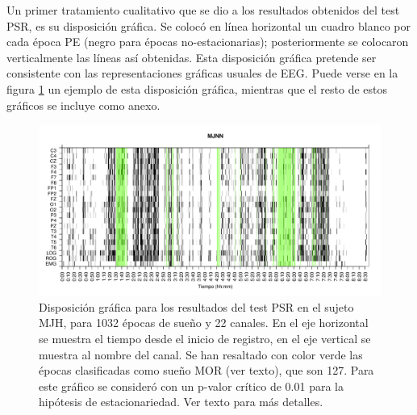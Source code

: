 %

Un primer tratamiento cualitativo que se dio a los resultados obtenidos del test PSR, es su
disposici\'on gr\'afica.
Se coloc\'o en l\'inea horizontal un cuadro blanco por cada
\'epoca PE (negro para \'epocas no-estacionarias);
posteriormente se colocaron verticalmente las
l\'ineas as\'i obtenidas.
Esta disposici\'on gr\'afica pretende ser consistente con las representaciones gr\'aficas
usuales de EEG.
Puede verse en la figura \ref{ejemplo1} un ejemplo de esta disposici\'on gr\'afica, mientras
que el resto de estos gr\'aficos se incluye como anexo.

\begin{figure}
\includegraphics[width=\textwidth]{MJNNVIGILOS_127_mor127_tot1032_esttotal.pdf} 
\caption{Disposici\'on gr\'afica para los resultados del test PSR en el sujeto MJH, 
para 1032 \'epocas de sue\~no y 22 canales. 
En el eje horizontal se muestra el tiempo desde el inicio de registro, en el eje vertical se muestra al 
nombre del canal. 
Se han resaltado con color verde las \'epocas clasificadas como sue\~no MOR (ver texto), que son 127.
Para este gr\'afico se consider\'o con un p-valor cr\'itico de 0.01 para la hip\'otesis
de estacionariedad. Ver texto para m\'as detalles.}
\label{ejemplo1}
\end{figure}

